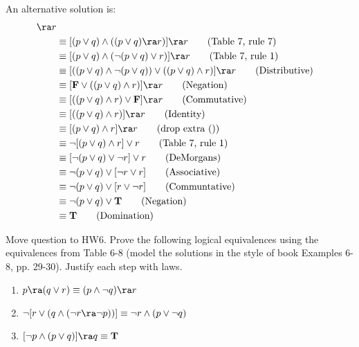 \begin{questions}
\begin{solution}
    An alternative solution is:
    \begin{align*}
      [(p \vee q) &\wedge ((p \ra r) \wedge (q \ra r))] \ra r \\
       &\equiv [(p \vee q) \wedge ((p \vee q) \ra r)] \ra r \tag{Table 7, rule 7} \\
       &\equiv [(p \vee q) \wedge (\neg (p \vee q) \vee r)] \ra r \tag{Table 7, rule 1} \\
       &\equiv [((p \vee q) \wedge \neg (p \vee q)) \vee ((p \vee q) \wedge r)] \ra r \tag{Distributive} \\
       &\equiv [\mathbf{F} \vee ((p \vee q) \wedge r)] \ra r \tag{Negation} \\
       & \equiv [((p \vee q) \wedge r) \vee \mathbf{F}] \ra r \tag{Commutative} \\
       & \equiv [((p \vee q) \wedge r)] \ra r \tag{Identity} \\
       & \equiv [(p \vee q) \wedge r] \ra r \tag{drop extra ()} \\
       & \equiv \neg [(p \vee q) \wedge r] \vee r \tag{Table 7, rule 1} \\
       & \equiv  [\neg (p \vee q) \vee \neg r] \vee r \tag{DeMorgans} \\
       & \equiv  \neg (p \vee q) \vee [\neg r \vee r ] \tag{Associative} \\
       & \equiv \neg (p \vee q) \vee [r \vee \neg r] \tag{Communtative} \\
       & \equiv \neg (p \vee q) \vee \mathbf{T} \tag{Negation} \\
       & \equiv \mathbf{T} \tag{Domination} 
    \end{align*}
    \end{solution}




 {\color{red} Move question to HW6}.
Prove the following logical equivalences using the
equivalences from Table 6-8 (model the solutions in the style of
book Examples 6-8, pp. 29-30).  Justify each step with laws.
\begin{enumerate}[label=(\alph*),itemsep=0pt,parsep=0pt,topsep=0pt,partopsep=0pt]
    \item $p \ra (q \vee r) \equiv (p \wedge \neg q) \ra r$
    \item $\neg [ r \vee (q \wedge (\neg r \ra \neg p))] \equiv \neg r \wedge (p \vee \neg q) $
    \item $ [ \neg p \wedge (p \vee q) ] \ra q \equiv \mathbf{T}$
\end{enumerate}



\end{questions}
